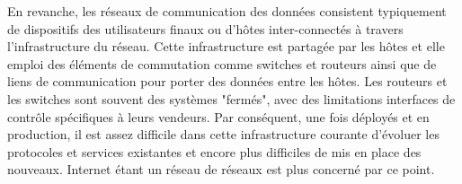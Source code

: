 En revanche, les réseaux de communication des données consistent typiquement de dispositifs des utilisateurs finaux ou d'hôtes inter-connectés à travers l'infrastructure du réseau. Cette infrastructure est partagée par les hôtes et elle emploi des éléments de commutation comme switches et routeurs ainsi que de liens de communication pour porter des données entre les hôtes. Les routeurs et les switches sont souvent des systèmes "fermés", avec des limitations interfaces de contrôle spécifiques à leurs vendeurs. Par conséquent, une fois déployés et en production, il est assez difficile dans cette infrastructure courante d'évoluer les protocoles et services existantes et encore plus difficiles de mis en place des nouveaux. Internet étant un réseau de réseaux est plus concerné par ce point. \cite{SurveySDNArchi}







